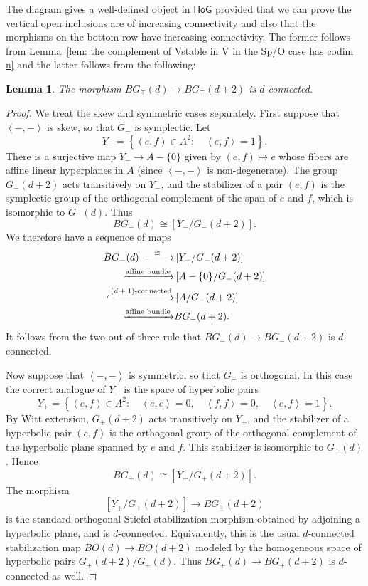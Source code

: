 \documentclass{amsart}
\newtheorem{lemma}[theorem]{Lemma}
\theoremstyle{definition}
\newcommand{\HoG}{\textsf{HoG}}
\begin{document}
The diagram gives a well-defined object in $\HoG$ provided that we can
prove the vertical open inclusions are of increasing connectivity and
also that the morphisms on the bottom row have increasing
connectivity. The former follows from Lemma~\ref{lem: the complement
of Vstable in V in the Sp/O case has codim n} and the latter follows
from the following:
\begin{lemma}
The morphism $BG_{\mp }(d)\to BG_{\mp }(d+2)$ is $d$-connected.
\end{lemma}
\begin{proof}
We treat the skew and symmetric cases separately. First suppose that
$\left\langle -,- \right\rangle$ is skew, so that $G_{-}$ is symplectic.
Let
\[
Y_{-}=\left\{(e,f)\in A^{2}: \quad \left\langle e,f \right\rangle = 1 \right\}.
\]
There is a surjective map $Y_{-}\to A-\{0 \}$ given by $(e,f)\mapsto e$
whose fibers are affine linear hyperplanes in $A$ (since $\left\langle
-,- \right\rangle$ is non-degenerate). The group $G_{-}(d+2)$ acts
transitively on $Y_{-}$, and the stabilizer of a pair $(e,f)$ is the
symplectic group of the orthogonal complement of the span of $e$ and
$f$, which is isomorphic to $G_{-}(d)$. Thus
\[
BG_{-}(d)\cong [Y_{-}/G_{-}(d+2)].
\]
We therefore have a sequence of maps
\begin{align*}
BG_{-}(d)\xrightarrow{\quad \cong\quad  }&
\left[Y_{-}/G_{-}(d+2)\right]\\
\xrightarrow{\text{affine bundle}}&
\left[A-\{0 \} / G_{-}(d+2) \right]\\
\xhookrightarrow{\text{$(d+1)$-connected}}&
\left[A / G_{-}(d+2) \right]\\
\xrightarrow{\text{affine bundle}}&
BG_{-}(d+2).
\end{align*}
It follows from the two-out-of-three rule that $BG_{-}(d)\to
BG_{-}(d+2)$ is $d$-connected.

Now suppose that $\left\langle -,- \right\rangle$ is symmetric, so that
$G_{+}$ is orthogonal. In this case the correct analogue of $Y_{-}$ is
the space of hyperbolic pairs
\[
Y_{+}=\left\{(e,f)\in A^{2}: \quad
\left\langle e,e \right\rangle=0,\quad
\left\langle f,f \right\rangle=0,\quad
\left\langle e,f \right\rangle=1 \right\}.
\]
By Witt extension, $G_{+}(d+2)$ acts transitively on $Y_{+}$, and the
stabilizer of a hyperbolic pair $(e,f)$ is the orthogonal group of the
orthogonal complement of the hyperbolic plane spanned by $e$ and $f$.
This stabilizer is isomorphic to $G_{+}(d)$. Hence
\[
BG_{+}(d)\cong [Y_{+}/G_{+}(d+2)].
\]
The morphism
\[
[Y_{+}/G_{+}(d+2)]\to BG_{+}(d+2)
\]
is the standard orthogonal Stiefel stabilization morphism obtained by
adjoining a hyperbolic plane, and is $d$-connected. Equivalently, this
is the usual $d$-connected stabilization map $BO(d)\to BO(d+2)$ modeled
by the homogeneous space of hyperbolic pairs $G_{+}(d+2)/G_{+}(d)$.
Thus $BG_{+}(d)\to BG_{+}(d+2)$ is $d$-connected as well.
\end{proof}
\end{document}
